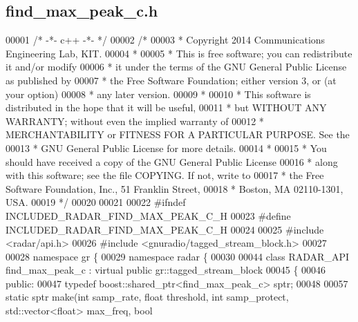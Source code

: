 \subsection{find\+\_\+max\+\_\+peak\+\_\+c.\+h}
\label{find__max__peak__c_8h_source}

\begin{DoxyCode}
00001 \textcolor{comment}{/* -*- c++ -*- */}
00002 \textcolor{comment}{/* }
00003 \textcolor{comment}{ * Copyright 2014 Communications Engineering Lab, KIT.}
00004 \textcolor{comment}{ * }
00005 \textcolor{comment}{ * This is free software; you can redistribute it and/or modify}
00006 \textcolor{comment}{ * it under the terms of the GNU General Public License as published by}
00007 \textcolor{comment}{ * the Free Software Foundation; either version 3, or (at your option)}
00008 \textcolor{comment}{ * any later version.}
00009 \textcolor{comment}{ * }
00010 \textcolor{comment}{ * This software is distributed in the hope that it will be useful,}
00011 \textcolor{comment}{ * but WITHOUT ANY WARRANTY; without even the implied warranty of}
00012 \textcolor{comment}{ * MERCHANTABILITY or FITNESS FOR A PARTICULAR PURPOSE.  See the}
00013 \textcolor{comment}{ * GNU General Public License for more details.}
00014 \textcolor{comment}{ * }
00015 \textcolor{comment}{ * You should have received a copy of the GNU General Public License}
00016 \textcolor{comment}{ * along with this software; see the file COPYING.  If not, write to}
00017 \textcolor{comment}{ * the Free Software Foundation, Inc., 51 Franklin Street,}
00018 \textcolor{comment}{ * Boston, MA 02110-1301, USA.}
00019 \textcolor{comment}{ */}
00020 
00021 
00022 \textcolor{preprocessor}{#ifndef INCLUDED\_RADAR\_FIND\_MAX\_PEAK\_C\_H}
00023 \textcolor{preprocessor}{#define INCLUDED\_RADAR\_FIND\_MAX\_PEAK\_C\_H}
00024 
00025 \textcolor{preprocessor}{#include <radar/api.h>}
00026 \textcolor{preprocessor}{#include <gnuradio/tagged\_stream\_block.h>}
00027 
00028 \textcolor{keyword}{namespace }gr \{
00029   \textcolor{keyword}{namespace }radar \{
00030 
00044     \textcolor{keyword}{class }RADAR_API find_max_peak_c : \textcolor{keyword}{virtual} \textcolor{keyword}{public} gr::tagged\_stream\_block
00045     \{
00046      \textcolor{keyword}{public}:
00047       \textcolor{keyword}{typedef} boost::shared\_ptr<find\_max\_peak\_c> sptr;
00048 
00057       \textcolor{keyword}{static} sptr make(\textcolor{keywordtype}{int} samp_rate, \textcolor{keywordtype}{float} threshold, \textcolor{keywordtype}{int} samp\_protect, std::vector<float> max\_freq, \textcolor{keywordtype}{bool} 

\end{DoxyCode}
